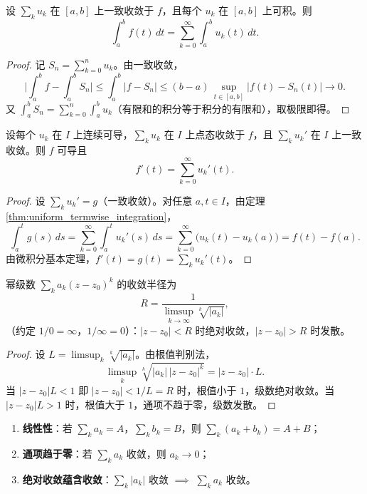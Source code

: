 \begin{theorem}[一致收敛的逐项积分]\label{thm:uniform_termwise_integration}
设 $\sum_k u_k$ 在 $[a,b]$ 上一致收敛于 $f$，且每个 $u_k$ 在 $[a,b]$ 上可积。则
\[
\int_a^b f(t)\,dt = \sum_{k=0}^{\infty} \int_a^b u_k(t)\,dt.
\]
\end{theorem}

\begin{proof}
记 $S_n = \sum_{k=0}^{n} u_k$。由一致收敛，
\[
\Big| \int_a^b f - \int_a^b S_n \Big| \le \int_a^b |f - S_n| \le (b-a)\, \sup_{t \in [a,b]} |f(t) - S_n(t)| \to 0.
\]
又 $\int_a^b S_n = \sum_{k=0}^{n} \int_a^b u_k$（有限和的积分等于积分的有限和），取极限即得。
\end{proof}

\begin{theorem}[一致收敛的逐项求导]\label{thm:uniform_termwise_differentiation}
设每个 $u_k$ 在 $I$ 上连续可导，$\sum_k u_k$ 在 $I$ 上点态收敛于 $f$，且 $\sum_k u_k'$ 在 $I$ 上一致收敛。则 $f$ 可导且
\[
f'(t) = \sum_{k=0}^{\infty} u_k'(t).
\]
\end{theorem}

\begin{proof}
设 $\sum_k u_k' = g$（一致收敛）。对任意 $a, t \in I$，由定理 \ref{thm:uniform_termwise_integration}，
\[
\int_a^t g(s)\,ds = \sum_{k=0}^{\infty} \int_a^t u_k'(s)\,ds = \sum_{k=0}^{\infty} \big( u_k(t) - u_k(a) \big) = f(t) - f(a).
\]
由微积分基本定理，$f'(t) = g(t) = \sum_k u_k'(t)$。
\end{proof}

\begin{theorem}[柯西-阿达马收敛半径公式]\label{thm:cauchy_hadamard}
幂级数 $\sum_k a_k (z - z_0)^k$ 的收敛半径为
\[
R = \frac{1}{\limsup_{k\to\infty} \sqrt[k]{|a_k|}},
\]
（约定 $1/0 = \infty$，$1/\infty = 0$）：$|z - z_0| < R$ 时绝对收敛，$|z - z_0| > R$ 时发散。
\end{theorem}

\begin{proof}
设 $L = \limsup_k \sqrt[k]{|a_k|}$。由根值判别法，
\[
\limsup_{k} \sqrt[k]{|a_k|\,|z-z_0|^k} = |z-z_0| \cdot L.
\]
当 $|z-z_0| L < 1$ 即 $|z-z_0| < 1/L = R$ 时，根值小于 $1$，级数绝对收敛。当 $|z-z_0| L > 1$ 时，根值大于 $1$，通项不趋于零，级数发散。
\end{proof}

\begin{property}[收敛级数的基本性质]\label{prop:series_properties}
\begin{enumerate}[label=(\roman*)]
    \item \textbf{线性性}：若 $\sum_k a_k = A$，$\sum_k b_k = B$，则 $\sum_k (a_k + b_k) = A + B$；
    \item \textbf{通项趋于零}：若 $\sum_k a_k$ 收敛，则 $a_k \to 0$；
    \item \textbf{绝对收敛蕴含收敛}：$\sum_k |a_k|$ 收敛 $\implies$ $\sum_k a_k$ 收敛。
\end{enumerate}
\end{property}

